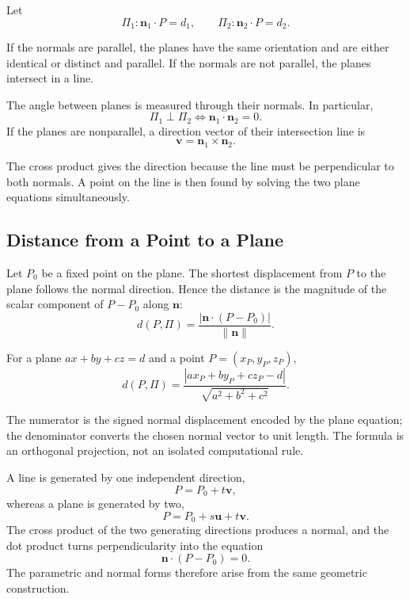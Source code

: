 Let
\[
\Pi_1:\mathbf n_1\cdot P=d_1,
\qquad
\Pi_2:\mathbf n_2\cdot P=d_2.
\]

\begin{corebox}
If the normals are parallel, the planes have the same orientation and are either
identical or distinct and parallel. If the normals are not parallel, the planes
intersect in a line.
\end{corebox}

\begin{theorembox}
The angle between planes is measured through their normals. In particular,
\[
\boxed{
\Pi_1\perp\Pi_2
\iff
\mathbf n_1\cdot\mathbf n_2=0
}.
\]
If the planes are nonparallel, a direction vector of their intersection line is
\[
\boxed{
\mathbf v=\mathbf n_1\times\mathbf n_2
}.
\]
\end{theorembox}

\begin{interpretationbox}
The cross product gives the direction because the line must be perpendicular to
both normals. A point on the line is then found by solving the two plane
equations simultaneously.
\end{interpretationbox}

\subsection{Distance from a Point to a Plane}

\begin{derivationbox}
Let $P_0$ be a fixed point on the plane. The shortest displacement from $P$ to
the plane follows the normal direction. Hence the distance is the magnitude of
the scalar component of $P-P_0$ along $\mathbf n$:
\[
d(P,\Pi)=\frac{|\mathbf n\cdot(P-P_0)|}{\|\mathbf n\|}.
\]
\end{derivationbox}

\begin{theorembox}
For a plane $ax+by+cz=d$ and a point $P=(x_P,y_P,z_P)$,
\[
\boxed{
d(P,\Pi)=
\frac{|ax_P+by_P+cz_P-d|}{\sqrt{a^2+b^2+c^2}}
}.
\]
\end{theorembox}

\begin{interpretationbox}
The numerator is the signed normal displacement encoded by the plane equation;
the denominator converts the chosen normal vector to unit length. The formula
is an orthogonal projection, not an isolated computational rule.
\end{interpretationbox}

\begin{summarybox}
A line is generated by one independent direction,
\[
P=P_0+t\mathbf v,
\]
whereas a plane is generated by two,
\[
P=P_0+s\mathbf u+t\mathbf v.
\]
The cross product of the two generating directions produces a normal, and the
dot product turns perpendicularity into the equation
\[
\mathbf n\cdot(P-P_0)=0.
\]
The parametric and normal forms therefore arise from the same geometric
construction.
\end{summarybox}